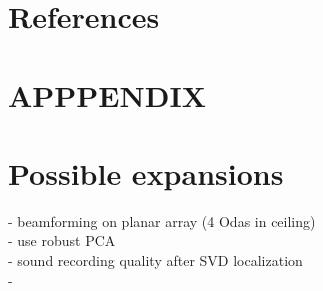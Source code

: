 \documentclass[journal]{IEEEtran}
\begin{document}

\section*{References}




\clearpage




\section{APPPENDIX}
\section{Possible expansions}

\noindent
- beamforming on planar array (4 Odas in ceiling)\\
- use robust PCA\\
- sound recording quality after SVD localization \\
-\\
\end{document}
